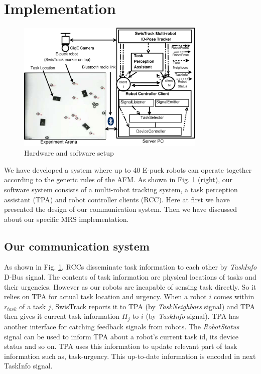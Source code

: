 \documentclass[letterpaper, 10 pt, times, conference]{ieeeconf} %
\begin{document}
\section{Implementation}
\label{sec:impl}
\begin{figure}
\centering
\includegraphics[width=9cm, angle=0]
{../dia-files/RIL-Expt-Setup2}
\caption{\small Hardware and software setup}
\label{fig:setup} %
\end{figure}
We have developed a system where up to 40 E-puck robots \cite{Epuck} can operate together according to the generic rules of the AFM. As shown in Fig. \ref{fig:setup} (right), our software system consists of a multi-robot tracking system, a task perception assistant (TPA) and robot controller clients (RCC). Here at first we have presented the design of our communication system. Then we have discussed about our specific MRS implementation. 
\subsection{Our communication system}
As shown in Fig. \ref{fig:setup}, RCCs disseminate task information to each other by \textit{TaskInfo} D-Bus signal. The contents of task information are physical locations of tasks and their urgencies. However as our robots are incapable of sensing task directly. So it relies on TPA for actual task location and urgency. When a robot $i$ comes within $r_{task}$ of a task $j$, SwisTrack reports it to TPA (by {\em TaskNeighbors} signal) and TPA then gives it current task information $H_j$ to $i$ (by {\em TaskInfo} signal).
TPA has another interface for catching feedback signals from robots. The \textit{RobotStatus} signal can be used to inform TPA about a robot's current task id, its device status and so on. TPA uses this information to update relevant part of task information such as, task-urgency. This up-to-date information is encoded in next TaskInfo signal.\\
\end{document}
